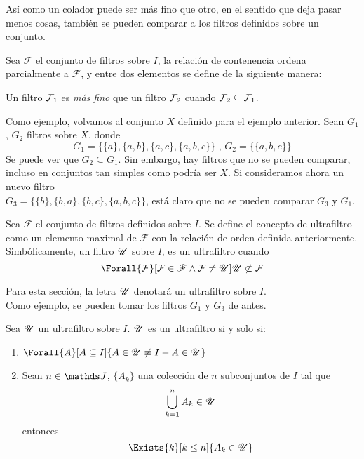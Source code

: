 Así como un colador puede ser más fino que otro, en el sentido que
deja pasar menos cosas, también se pueden comparar a los filtros definidos
sobre un conjunto.

\begin{definition}
  Sea $\mathscr{F}$ el conjunto de filtros sobre $I$, la relación de contenencia
  ordena parcialmente a $\mathscr{F}$, y entre dos elementos se define de la siguiente
  manera:

  Un filtro $\mathcal{F}_1$ es \emph{más fino} que un filtro $\mathcal{F}_2$ cuando $\mathcal{F}_2 \subseteq \mathcal{F}_1$.
\end{definition}

Como ejemplo, volvamos al conjunto $X$ definido para el ejemplo anterior. Sean $G_1$, $G_2$
filtros sobre $X$, donde
\[G_1 = \{\{a\}, \{a,b\},\{a,c\},\{a,b,c\}\}\text{ , } G_2 = \{\{a,b,c\}\}\]
Se puede ver que $G_2 \subseteq G_1$. Sin embargo, hay filtros que no
se pueden comparar, incluso en conjuntos tan simples como podría ser
$X$. Si consideramos ahora un nuevo filtro\\
$G_3 = \{\{b\}, \{b,a\},\{b,c\},\{a,b,c\}\}$, está claro que no se pueden comparar
$G_3$ y $G_1$.

\begin{definition}
  Sea $\mathscr{F}$ el conjunto de filtros definidos sobre $I$. Se define
  el concepto de ultrafiltro como un elemento maximal de $\mathscr{F}$ con
  la relación de orden definida anteriormente. Simbólicamente,
  un filtro $\mathscr{U}$ sobre $I$, es un ultrafiltro cuando
  \[\Forall{\F}[\F\in\mathscr{F}\land\F \not=\U]{\U\not\subset\F}\]

  Para esta sección, la letra $\mathscr{U}$ denotará un ultrafiltro sobre $I$.\\
  Como ejemplo, se pueden tomar los filtros $G_1$ y $G_3$ de antes.
\end{definition}
\pagebreak
\begin{theorem}[Caracterizaciones]
  Sea $\mathscr{U}$ un ultrafiltro sobre $I$. $\mathscr{U}$ es un ultrafiltro si y solo si:
  \begin{enumerate}
    \item $\Forall{A}[A\subseteq I]{A\in\U \not\equiv I-A \in \U}$
    \item Sean $n\in\J$, $\{A_k\}$ una colección de $n$ subconjuntos de $I$ tal que
          \[\bigcup_{k=1}^n A_k \in \mathscr{U}\]
          entonces
          \[\Exists{k}[k\leq n]{A_k\in\U}\]
  \end{enumerate}
\end{theorem}

